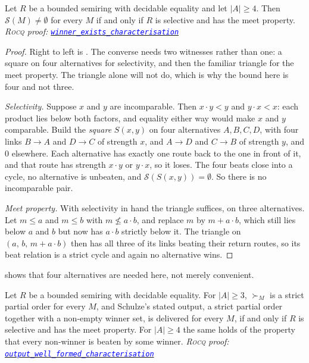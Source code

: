 \documentclass[a4paper,UKenglish,cleveref,autoref,thm-restate,anonymous]{lipics-v2021}
\newcommand{\rocq}{\textsc{Rocq}}
\newcommand{\anonrepo}{https://anonymous.4open.science/r/Semiring_graph_algorithm-000E}
\newcommand{\rocqfile}[2]{\href{\anonrepo/#1}{\textcolor{blue}{\texttt{#2}}}}
\newcommand{\proofat}[2]{{\footnotesize\itshape\rocq{} proof: \rocqfile{#1}{#2}}}
\begin{document}
\begin{theorem}\label{thm:winnerchar}
Let $R$ be a bounded semiring with decidable equality and let $|A| \geq 4$.
Then $\mathcal{S}(M) \neq \emptyset$ for every $M$ if and only if $R$ is
selective and has the meet property.
\proofat{algorithm/WinnerexistenceN.v}{winner\_exists\_\allowbreak characterisation}
\end{theorem}

\begin{proof}
Right to left is . The converse needs two witnesses rather
than one: a square on four alternatives for selectivity, and then the
familiar triangle for the meet property. The triangle alone will not do,
which is why the bound here is four and not three.

\emph{Selectivity.} Suppose $x$ and $y$ are incomparable. Then
$x \cdot y < y$ and $y \cdot x < x$: each product lies below both factors,
and equality either way would make $x$ and $y$ comparable. Build the
\emph{square} $S(x,y)$ on four alternatives $A, B, C, D$, with four links
$B \to A$ and $D \to C$ of strength $x$, and $A \to D$ and $C \to B$ of strength $y$,
and $0$ elsewhere. Each alternative has exactly one route back to the one
in front of it, and that route has strength $x\cdot y$ or $y \cdot x$, so it
loses. The four beats close into a cycle, no alternative is unbeaten, and
$\mathcal{S}(S(x,y)) = \emptyset$. So there is no incomparable pair.

\emph{Meet property.} With selectivity in hand the triangle suffices, on
three alternatives. Let $m \leq a$ and $m \leq b$ with
$m \not\leq a\cdot b$, and replace $m$ by $m + a\cdot b$, which still lies
below $a$ and $b$ but now has $a \cdot b$ strictly below it. The triangle on
$(a,\, b,\, m + a\cdot b)$ then has all three of its links beating their
return routes, so its beat relation is a strict cycle and again no
alternative wins.
\end{proof}

 shows that four alternatives are needed here, not merely
convenient.

\begin{corollary}\label{thm:outputchar}
Let $R$ be a bounded semiring with decidable equality. For $|A| \geq 3$,
$\succ_M$ is a strict partial order for every $M$, and Schulze's stated
output, a strict partial order together with a non-empty winner set, is
delivered for every $M$, if and only if $R$ is selective and has the meet
property. For $|A| \geq 4$ the same holds of the property that every
non-winner is beaten by some winner.
\proofat{algorithm/CharacterisationsN.v}{output\_well\_formed\_\allowbreak characterisation}
\end{corollary}
\end{document}

